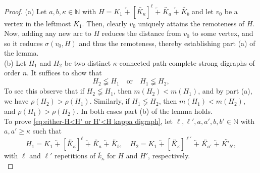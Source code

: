 \documentclass[a4paper,11pt]{article}
\begin{document}
\begin{proof}
(a) Let $a,b,\kappa \in \mathbb{N}$ with $H = K_1 \; \overleftarrow{+} \; [ \overleftrightarrow{K_\kappa}]^{\ell} \; \overleftarrow{+} \; \overleftrightarrow{K_a} \; \overleftarrow{+} \; \overleftrightarrow{K_b}$ and let $v_0$ be a vertex in the leftmost $K_1$. Then, clearly $v_0$ uniquely attains the remoteness of $H$. Now, adding any new arc to $H$ reduces the distance from $v_0$ to some vertex, and so it reduces $\sigma(v_0, H)$ and thus the remoteness, thereby establishing part (a) of the lemma.\\

(b) Let $H_1$ and $H_2$ be two distinct $\kappa$-connected path-complete strong digraphs of order $n$. 
It suffices to show that 
\begin{equation} \label{eq:either-H<H' or H'<H kappa digraph}
H_2 \lneqq H_1 \quad \textrm{or} \quad H_1 \lneqq H_2, 
\end{equation}
To see this observe that if $H_2 \lneqq H_1$, then $m(H_2) < m(H_1)$, and by part (a), we have $\rho(H_2) > \rho(H_1)$. Similarly, if $H_1 \lneqq H_2$, then 
$m(H_1) < m(H_2)$, and $\rho(H_1) > \rho(H_2)$. In both cases part (b) of the lemma holds.  \\

To prove \eqref{eq:either-H<H' or H'<H kappa digraph}, let $\ell, \ell', a, a', b, b' \in \mathbb{N}$ with $a, a' \geq \kappa$ such that 
\[ H_1 =K_1 \; \overleftarrow{+} \; [ \overleftrightarrow{K_\kappa}]^{\ell} \; \overleftarrow{+} \; \overleftrightarrow{K_a} \; \overleftarrow{+} \; \overleftrightarrow{K_b}, \quad 
  H_2 = K_1 \; \overleftarrow{+} \; [ \overleftrightarrow{K_\kappa}]^{\ell'} \; \overleftarrow{+} \; \overleftrightarrow{K_{a'}} \; \overleftarrow{+} \; \overleftrightarrow{K'_{b'}}, \]  
with $\ell$ and $\ell'$ repetitions of $\overleftrightarrow{k_{\kappa}}$ for $H$ and $H'$, respectively. \\


\end{proof}
\end{document}
